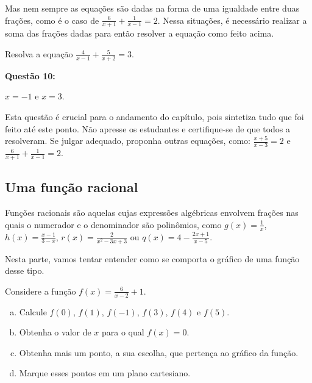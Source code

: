 \documentclass[main.tex]{subfiles}
\begin{document}
Mas nem sempre as equações são dadas na forma de uma igualdade entre duas frações, como é o caso de $\frac{6}{x+1}+\frac{1}{x-1}=2$. Nessa situações, é necessário realizar a soma das frações dadas para então resolver a equação como feito acima.

\begin{questao}
Resolva a equação $\frac{4}{x-1}+\frac{5}{x+2}=3$.
\end{questao}

\noindent\textbf{Questão 10:} 
\begin{gabarito}
	\begin{gabaritoQuestao}
		$x=-1$ e $x=3$.
	\end{gabaritoQuestao}
\end{gabarito}

\paraTutores

Esta questão é crucial para o andamento do capítulo, pois sintetiza tudo que foi feito até este ponto. Não apresse os estudantes e certifique-se de que todos a resolveram. Se julgar adequado, proponha outras equações, como: $\frac{x+5}{x-3}=2$ e $\frac{6}{x+1}+\frac{1}{x-1}=2$.

\paraAmbos

\subsection*{Uma função racional}

Funções racionais são aquelas cujas expressões algébricas envolvem frações nas quais o numerador e o denominador são polinômios, como $g(x)=\frac{1}{x}$, $h(x)=\frac{x-1}{3-x}$, $r(x)=\frac{2}{x^2-3x+3}$ ou $q(x)=4-\frac{2x+1}{x-5}$.

Nesta parte, vamos tentar entender como se comporta o gráfico de uma função desse tipo.

\begin{questao}
Considere a função $f(x)=\frac{6}{x-2}+1$.
\begin{enumerate}[a)]
\item Calcule $f(0)$, $f(1)$, $f(-1)$, $f(3)$, $f(4)$ e $f(5)$.
\item Obtenha o valor de $x$ para o qual $f(x)=0$.
\item Obtenha mais um ponto, a sua escolha, que pertença ao gráfico da função.
\item Marque esses pontos em um plano cartesiano.
\end{enumerate}
\end{questao}
\end{document}
